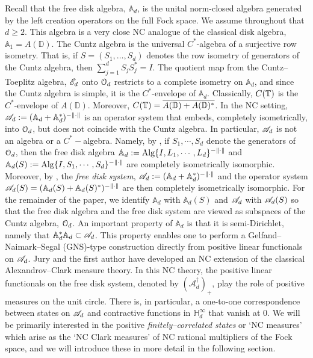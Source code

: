 \documentclass{article}
\theoremstyle{definition}
\theoremstyle{remark}
\numberwithin{equation}{section}
\newcommand{\mr}{\ensuremath{\mathrm}}
\newcommand{\scr}{\ensuremath{\mathscr}}
\newcommand{\cuntz}{\ensuremath{\cO_d}}
\def\D{\mathbb{D}}
\def\bH{\mathbb{H}}
\def\A{\mathbb{A} _d}
\def\posncm{(\mathscr{A} _d ^\dagger) _+}
\begin{document}
Recall that the free disk algebra, $\A$, is the unital norm-closed algebra generated by the left creation operators on the full Fock space. We assume throughout that $d \geq 2$. This algebra is a very close NC analogue of the classical disk algebra, $\mathbb{A}_1 = A(\D)$. The Cuntz algebra is the universal $C^*$-algebra of a surjective row isometry. That is, if  $S = (S_1,\ldots,S_d)$ denotes the row isometry of generators of the Cuntz algebra, then $\sum_{j=1}^d S_j S_j^* = I$. The quotient map from the Cuntz--Toeplitz algebra, $\scr{E} _d$ onto $\cuntz$ restricts to a complete isometry on $\A$, and since the Cuntz algebra is simple, it is the $C^*$-envelope of $\A$. Classically, $C({\mathbb T})$ is the $C^*$-envelope of $A(\D)$. Moreover, $C(\T) = \overline{A(\D) + A(\D)^*}$. In the NC setting, $\scr{A} _d := ( \A + \A ^* ) ^{-\| \cdot \|}$ is an operator system that embeds, completely isometrically, into $\cuntz$, but does not coincide with the Cuntz algebra. In particular, $\scr{A} _d$ is not an algebra or a $C^*-$algebra. Namely, by \cite[Theorem 3.1]{Pop-ncdisk}, if $S_1, \cdots, S_d$ denote the generators of $\cuntz$, then the free disk algebra $\A := \mr{Alg} \{ I , L_1 , \cdots , L_d \} ^{- \| \cdot \|}$ and $\A (S) := \mr{Alg} \{ I , S_1 , \cdots , S_d \} ^{- \| \cdot \|}$ are completely isometrically isomorphic. Moreover, by \cite[Proposition 3.5]{Paulsen-cbmaps}, the \emph{free disk system}, $\scr{A} _d := ( \A + \A ^* ) ^{-\| \cdot \|}$ and the operator system $\scr{A} _d (S) = ( \A (S) + \A (S) ^* ) ^{-\| \cdot \|}$ are then completely isometrically isomorphic. For the remainder of the paper, we identify $\A$ with $\A (S)$ and $\scr{A} _d$ with $\scr{A} _d (S)$ so that the free disk algebra and the free disk system are viewed as subspaces of the Cuntz algebra, $\cuntz$. An important property of $\A$ is that it is semi-Dirichlet, namely that $\A^* \A \subset \scr{A}_d$. This property enables one to perform a Gelfand--Naimark--Segal (GNS)-type construction directly from positive linear functionals on $\scr{A}_d$. Jury and the first author \cite{JM-freeAC} have developed an NC extension of the classical Alexandrov--Clark measure theory. In this NC theory, the positive linear functionals on the free disk system, denoted by $\posncm$, play the role of positive measures on the unit circle. There is, in particular, a one-to-one correspondence between states on $\scr{A}_d$ and contractive functions in $\bH^{\infty}_d$ that vanish at $0$. We will be primarily interested in the positive \emph{finitely--correlated states} or `NC measures' which arise as the `NC Clark measures' of NC rational multipliers of the Fock space, and we will introduce these in more detail in the following section.
\end{document}
